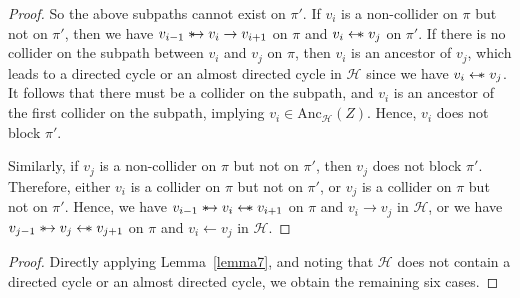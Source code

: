 \documentclass[accepted]{uai2025} %
\newcommand{\anc}{\text{Anc}}
\newcommand{\hus}{\mathrel{{\leftarrow\mkern-11mu\ast}}}
\newcommand{\suh}{\mathrel{{\ast\mkern-11mu\to}}}
\begin{document}
\begin{proof}
So the above subpaths cannot exist on \( \pi' \). If \( v_i \) is a non-collider on \( \pi \) but not on \( \pi' \), then we have \( v_{i-1} \suh v_i \rightarrow v_{i+1} \) on \( \pi \) and \( v_i \hus  v_j \) on $\pi'$. If there is no collider on the subpath between \( v_i \) and \( v_j \) on \( \pi \), then \( v_i \) is an ancestor of \( v_j \), which leads to a directed cycle or an almost directed cycle in \( \mathcal{H} \) since we have \( v_i \hus  v_j \). It follows that there must be a collider on the subpath, and \( v_i \) is an ancestor of the first collider on the subpath, implying \( v_i \in \anc_\mathcal{H} (Z) \). Hence, \( v_i \) does not block \( \pi' \). 

Similarly, if \( v_j \) is a non-collider on \( \pi \) but not on \( \pi' \), then \( v_j \) does not block \( \pi' \). Therefore, either \( v_i \) is a collider on \( \pi \) but not on \( \pi' \), or \( v_j \) is a collider on \( \pi \) but not on \( \pi' \). Hence, we have \( v_{i-1}\suh v_i \hus  v_{i+1} \) on \( \pi \) and \( v_i \rightarrow v_j \) in \( \mathcal{H} \), or we have \( v_{j-1} \suh v_j\hus v_{j+1} \) on \( \pi \) and \( v_i \leftarrow v_j \) in \( \mathcal{H} \).
\end{proof}


\lemmaeight*
\begin{proof}
Directly applying Lemma~\ref{lemma7}, and noting that \( \mathcal{H} \) does not contain a directed cycle or an almost directed cycle, we obtain the remaining six cases. 
\end{proof}





\end{document}
